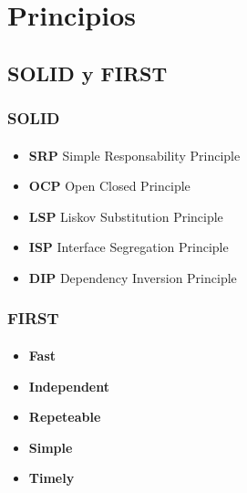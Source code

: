  \section{Principios}

  \subsection{SOLID y FIRST}

  \begin{frame}
   \frametitle{SOLID}
   \framesubtitle{}

   \begin{itemize}
    \item \textbf{SRP} Simple Responsability Principle
    \item \textbf{OCP} Open Closed Principle
    \item \textbf{LSP} Liskov Substitution Principle
    \item \textbf{ISP} Interface Segregation Principle
    \item \textbf{DIP} Dependency Inversion Principle
   \end{itemize}
  \end{frame}


  \begin{frame}
   \frametitle{FIRST}
   \framesubtitle{}

   \begin{itemize}
    \item \textbf{Fast}
    \item \textbf{Independent}
    \item \textbf{Repeteable}
    \item \textbf{Simple}
    \item \textbf{Timely}
   \end{itemize}
  \end{frame}
